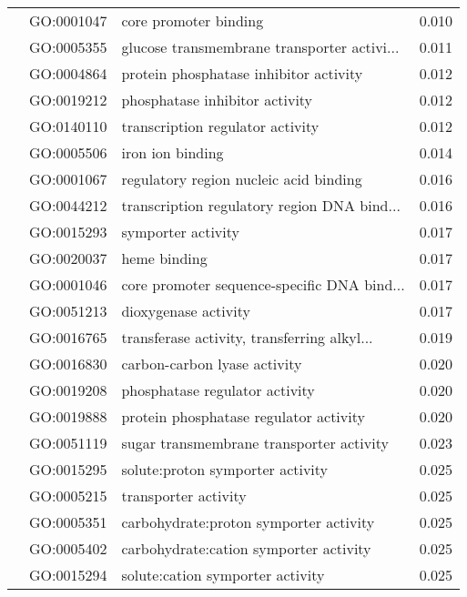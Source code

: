 \begin{longtable}{lllr}
   & GO:0001047 &                        core promoter binding &         0.010 \\
   & GO:0005355 &  glucose transmembrane transporter activi... &         0.011 \\
   & GO:0004864 &       protein phosphatase inhibitor activity &         0.012 \\
   & GO:0019212 &               phosphatase inhibitor activity &         0.012 \\
   & GO:0140110 &             transcription regulator activity &         0.012 \\
   & GO:0005506 &                             iron ion binding &         0.014 \\
   & GO:0001067 &       regulatory region nucleic acid binding &         0.016 \\
   & GO:0044212 &  transcription regulatory region DNA bind... &         0.016 \\
   & GO:0015293 &                           symporter activity &         0.017 \\
   & GO:0020037 &                                 heme binding &         0.017 \\
   & GO:0001046 &  core promoter sequence-specific DNA bind... &         0.017 \\
   & GO:0051213 &                         dioxygenase activity &         0.017 \\
   & GO:0016765 &  transferase activity, transferring alkyl... &         0.019 \\
   & GO:0016830 &                 carbon-carbon lyase activity &         0.020 \\
   & GO:0019208 &               phosphatase regulator activity &         0.020 \\
   & GO:0019888 &       protein phosphatase regulator activity &         0.020 \\
   & GO:0051119 &     sugar transmembrane transporter activity &         0.023 \\
   & GO:0015295 &             solute:proton symporter activity &         0.025 \\
   & GO:0005215 &                         transporter activity &         0.025 \\
   & GO:0005351 &       carbohydrate:proton symporter activity &         0.025 \\
   & GO:0005402 &       carbohydrate:cation symporter activity &         0.025 \\
   & GO:0015294 &             solute:cation symporter activity &         0.025 \\

\end{longtable}
